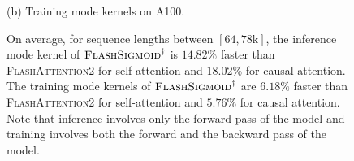 \begin{figure}[!htbp]
\begin{minipage}{0.46\textwidth}
        \captionsetup{justification=centering} 
        \caption*{
            (b) Training mode kernels on A100.
        }
    \end{minipage}
    \caption{
        On average, for sequence lengths between $[64, 78\mathrm{k}]$, the inference mode kernel of $\textsc{FlashSigmoid}^{\dagger}$ is ${14.82}\%$ faster than \textsc{FlashAttention2} for self-attention and ${18.02}\%$ for causal attention.
        The training mode kernels of $\textsc{FlashSigmoid}^{\dagger}$ are ${6.18}\%$ faster than \textsc{FlashAttention2} for self-attention and ${5.76}\%$ for causal attention.
        Note that inference involves only the forward pass of the model and training involves both the forward and the backward pass of the model. 
    }
    \label{fig:a100-softmax-sigmoid-fwd-bwd-special-variant}
\end{figure}
\vspace{-0.1in}
